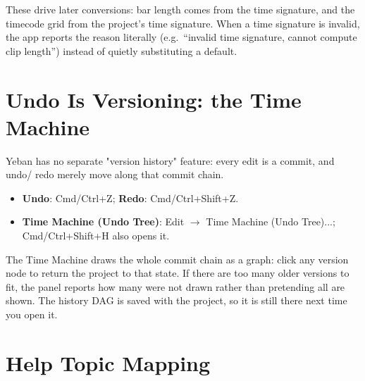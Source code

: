 These drive later conversions: bar length comes from the time signature, and the
timecode grid from the project's time signature. When a time signature is invalid,
the app reports the reason literally (e.g.\ ``invalid time signature, cannot compute
clip length'') instead of quietly substituting a default.


\section{Undo Is Versioning: the Time Machine}

Yeban has no separate "version history" feature: every edit is a commit, and undo/
redo merely move along that commit chain.

\begin{itemize}
  \item \textbf{Undo}: Cmd/Ctrl+Z; \textbf{Redo}: Cmd/Ctrl+Shift+Z.
  \item \textbf{Time Machine (Undo Tree)}: Edit $\to$ Time Machine (Undo Tree)...; Cmd/Ctrl+Shift+H also opens it.
\end{itemize}

The Time Machine draws the whole commit chain as a graph: click any version node to
return the project to that state. If there are too many older versions to fit, the
panel reports how many were not drawn rather than pretending all are shown. The
history DAG is saved with the project, so it is still there next time you open it.


\section{Help Topic Mapping}

